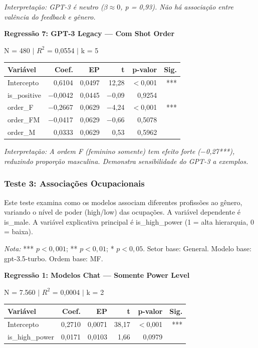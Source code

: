 \documentclass[12pt,a4paper]{article}
\begin{document}
\noindent\textit{Interpretação: GPT-3 é neutro ($\beta \approx 0$, p = 0,93). Não há associação
entre valência do feedback e gênero.}

\vspace{0.5cm}
\noindent\textbf{Regressão 7: GPT-3 Legacy --- Com Shot Order}

\noindent N = 480 $|$ $R^2$ = 0,0554 $|$ k = 5

\begin{table}[H]
\centering
\begin{tabular}{lrrrrr}
\toprule
\textbf{Variável} & \textbf{Coef.} & \textbf{EP} & \textbf{t} & \textbf{p-valor} & \textbf{Sig.} \\
\midrule
Intercepto & 0,6104 & 0,0497 & 12,28 & $<$0,001 & *** \\
is\_positive & $-$0,0042 & 0,0445 & $-$0,09 & 0,9254 & \\
order\_F & $-$0,2667 & 0,0629 & $-$4,24 & $<$0,001 & *** \\
order\_FM & $-$0,0417 & 0,0629 & $-$0,66 & 0,5078 & \\
order\_M & 0,0333 & 0,0629 & 0,53 & 0,5962 & \\
\bottomrule
\end{tabular}
\end{table}

\noindent\textit{Interpretação: A ordem F (feminino somente) tem efeito forte
($-$0,27***), reduzindo proporção masculina. Demonstra sensibilidade do
GPT-3 a exemplos.}


\subsubsection{Teste 3: Associações Ocupacionais}

Este teste examina como os modelos associam diferentes profissões ao
gênero, variando o nível de poder (high/low) das ocupações. A variável
dependente é is\_male. A variável explicativa principal é is\_high\_power
(1 = alta hierarquia, 0 = baixa).

\textit{Nota:} *** $p < 0,001$; ** $p < 0,01$; * $p < 0,05$. Setor base:
General. Modelo base: gpt-3.5-turbo. Ordem base: MF.

\vspace{0.5cm}
\noindent\textbf{Regressão 1: Modelos Chat --- Somente Power Level}

\noindent N = 7.560 $|$ $R^2$ = 0,0004 $|$ k = 2

\begin{table}[H]
\centering
\begin{tabular}{lrrrrr}
\toprule
\textbf{Variável} & \textbf{Coef.} & \textbf{EP} & \textbf{t} & \textbf{p-valor} & \textbf{Sig.} \\
\midrule
Intercepto & 0,2710 & 0,0071 & 38,17 & $<$0,001 & *** \\
is\_high\_power & 0,0171 & 0,0103 & 1,66 & 0,0979 & \\
\bottomrule
\end{tabular}
\end{table}
\end{document}

